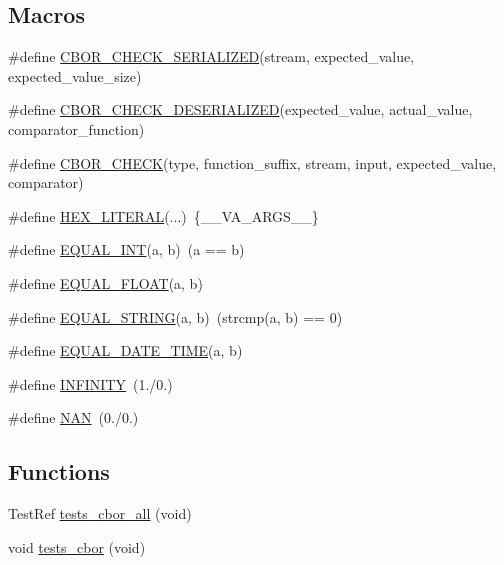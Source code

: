 \subsection*{Macros}
\begin{DoxyCompactItemize}
\item 
\#define \hyperlink{tests-cbor_8c_aee25eb17d0e99fde14dda9e45fb6d111}{C\+B\+O\+R\+\_\+\+C\+H\+E\+C\+K\+\_\+\+S\+E\+R\+I\+A\+L\+I\+Z\+ED}(stream,  expected\+\_\+value,  expected\+\_\+value\+\_\+size)
\item 
\#define \hyperlink{tests-cbor_8c_aea260b48d92bb28a55f49063acec08f5}{C\+B\+O\+R\+\_\+\+C\+H\+E\+C\+K\+\_\+\+D\+E\+S\+E\+R\+I\+A\+L\+I\+Z\+ED}(expected\+\_\+value,  actual\+\_\+value,  comparator\+\_\+function)
\item 
\#define \hyperlink{tests-cbor_8c_a65f1a265d0f7b6ec1a55c2784f6da274}{C\+B\+O\+R\+\_\+\+C\+H\+E\+CK}(type,  function\+\_\+suffix,  stream,  input,  expected\+\_\+value,  comparator)
\item 
\#define \hyperlink{tests-cbor_8c_a98761d72bdb308a72bd430b2cd3dce69}{H\+E\+X\+\_\+\+L\+I\+T\+E\+R\+AL}(...)~\{\+\_\+\+\_\+\+V\+A\+\_\+\+A\+R\+G\+S\+\_\+\+\_\+\}
\item 
\#define \hyperlink{tests-cbor_8c_a28b1e4b13c7e8e9675db35a07f326587}{E\+Q\+U\+A\+L\+\_\+\+I\+NT}(a,  b)~(a == b)
\item 
\#define \hyperlink{tests-cbor_8c_a23cd433698bdb7a2cf5adf6c7a1a0f5c}{E\+Q\+U\+A\+L\+\_\+\+F\+L\+O\+AT}(a,  b)
\item 
\#define \hyperlink{tests-cbor_8c_aa0920f7f70175036c6ef8f6b52ebbf95}{E\+Q\+U\+A\+L\+\_\+\+S\+T\+R\+I\+NG}(a,  b)~(strcmp(a, b) == 0)
\item 
\#define \hyperlink{tests-cbor_8c_a2bf61b15c14a09a99cd2fe190cddb01c}{E\+Q\+U\+A\+L\+\_\+\+D\+A\+T\+E\+\_\+\+T\+I\+ME}(a,  b)
\item 
\#define \hyperlink{tests-cbor_8c_a956e2723d559858d08644ac99146e910}{I\+N\+F\+I\+N\+I\+TY}~(1./0.)
\item 
\#define \hyperlink{tests-cbor_8c_a8abfcc76130f3f991d124dd22d7e69bc}{N\+AN}~(0./0.)
\end{DoxyCompactItemize}
\subsection*{Functions}
\begin{DoxyCompactItemize}
\item 
Test\+Ref \hyperlink{tests-cbor_8c_a24bf196efee7f18a547beae07f47b7f4}{tests\+\_\+cbor\+\_\+all} (void)
\item 
void \hyperlink{tests-cbor_8c_a24c307f8691c7f8d3bb6e03cf3925134}{tests\+\_\+cbor} (void)
\end{DoxyCompactItemize}


